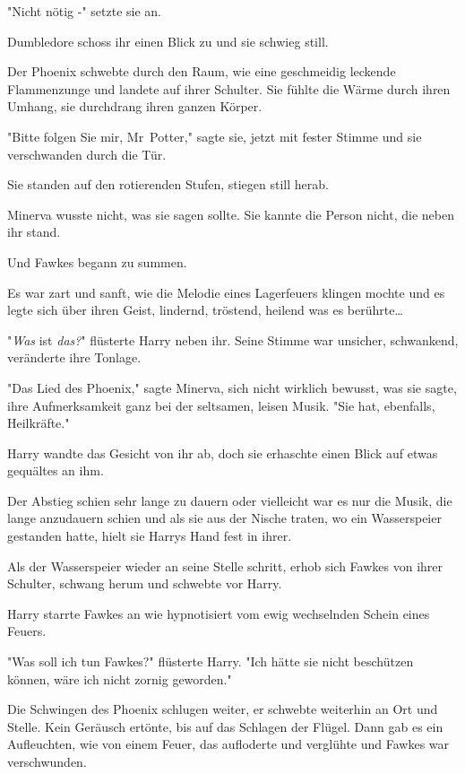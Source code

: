 {"Nicht nötig -" setzte sie an.

Dumbledore schoss ihr einen Blick zu und sie schwieg still.

Der Phoenix schwebte durch den Raum, wie eine geschmeidig leckende Flammenzunge und landete auf ihrer Schulter. Sie fühlte die Wärme durch ihren Umhang, sie durchdrang ihren ganzen Körper.

"Bitte folgen Sie mir, Mr~Potter," sagte sie, jetzt mit fester Stimme und sie verschwanden durch die Tür.

\later

Sie standen auf den rotierenden Stufen, stiegen still herab.

Minerva wusste nicht, was sie sagen sollte. Sie kannte die Person nicht, die neben ihr stand.

Und Fawkes begann zu summen.

Es war zart und sanft, wie die Melodie eines Lagerfeuers klingen mochte und es legte sich über ihren Geist, lindernd, tröstend, heilend was es berührte…

"\emph{Was} ist \emph{das?}" flüsterte Harry neben ihr. Seine Stimme war unsicher, schwankend, veränderte ihre Tonlage.

"Das Lied des Phoenix," sagte Minerva, sich nicht wirklich bewusst, was sie sagte, ihre Aufmerksamkeit ganz bei der seltsamen, leisen Musik. "Sie hat, ebenfalls, Heilkräfte."

Harry wandte das Gesicht von ihr ab, doch sie erhaschte einen Blick auf etwas gequältes an ihm.

Der Abstieg schien sehr lange zu dauern oder vielleicht war es nur die Musik, die lange anzudauern schien und als sie aus der Nische traten, wo ein Wasserspeier gestanden hatte, hielt sie Harrys Hand fest in ihrer.

Als der Wasserspeier wieder an seine Stelle schritt, erhob sich Fawkes von ihrer Schulter, schwang herum und schwebte vor Harry.

Harry starrte Fawkes an wie hypnotisiert vom ewig wechselnden Schein eines Feuers.

"Was soll ich tun Fawkes?" flüsterte Harry. "Ich hätte sie nicht beschützen können, wäre ich nicht zornig geworden."

Die Schwingen des Phoenix schlugen weiter, er schwebte weiterhin an Ort und Stelle. Kein Geräusch ertönte, bis auf das Schlagen der Flügel. Dann gab es ein Aufleuchten, wie von einem Feuer, das aufloderte und verglühte und Fawkes war verschwunden.

}
